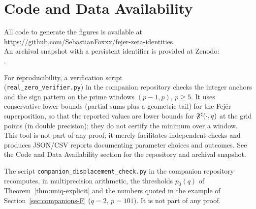 \section*{Code and Data Availability}
All code to generate the figures is available at \\
\url{https://github.com/SebastianFoxxx/fejer-zeta-identities}.\\
An archival snapshot with a persistent identifier is provided at Zenodo:\\
.

\begin{remark}
For reproducibility, a verification script \\
(\texttt{real\_zero\_verifier.py}) in the companion repository
checks the integer anchors and the sign pattern on the prime windows $(p-1,p)$, $p\ge5$.
It uses conservative lower bounds (partial sums plus a geometric tail) for the Fej\'er superposition, so that the reported
values are lower bounds for $\mathfrak F^{\sharp}(\cdot,q)$ at the grid points (in double precision); they do not certify the minimum over a window.
This tool is not part of any proof; it merely facilitates independent checks and produces JSON/CSV reports
documenting parameter choices and outcomes.
See the Code and Data Availability section for the repository and archival snapshot.
\end{remark}

\begin{remark}
The script \texttt{companion\_displacement\_check.py} in the companion repository recomputes, in multiprecision arithmetic, the thresholds $p_0(q)$ of Theorem~\ref{thm:uniq-explicit} and the numbers quoted in the example of Section~\ref{sec:companions-F} ($q=2$, $p=101$). It is not part of any proof.
\end{remark}

